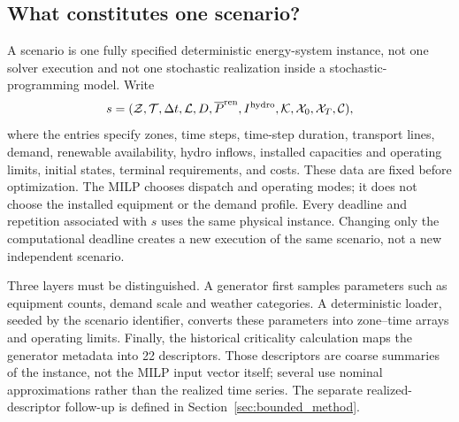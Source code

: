 \subsection{What constitutes one scenario?}
\label{sec:scenario_definition}
A scenario is one fully specified deterministic energy-system instance,
not one solver execution and not one stochastic realization inside a
stochastic-programming model. Write
\begin{equation}
 s=(\mathcal Z,\mathcal T,\Delta t,\mathcal L,
     D,\overline P^{\rm ren},I^{\rm hydro},\mathcal K,
     \mathcal X_0,\mathcal X_T,\mathcal C),
 \label{eq:scenario_tuple}
\end{equation}
where the entries specify zones, time steps, time-step duration, transport
lines, demand, renewable availability, hydro inflows, installed capacities
and operating limits, initial states, terminal requirements, and costs.
These data are fixed before optimization. The MILP chooses dispatch and
operating modes; it does not choose the installed equipment or the demand
profile. Every deadline and repetition associated with $s$ uses the same
physical instance. Changing only the computational deadline creates a new
execution of the same scenario, not a new independent scenario.

Three layers must be distinguished. A generator first samples parameters
such as equipment counts, demand scale and weather categories. A deterministic
loader, seeded by the scenario identifier, converts these parameters into
zone--time arrays and operating limits. Finally, the historical criticality calculation
maps the generator metadata into 22 descriptors. Those descriptors are
coarse summaries of the instance, not the MILP input vector itself; several
use nominal approximations rather than the realized time series. The separate
realized-descriptor follow-up is defined in Section~\ref{sec:bounded_method}.

